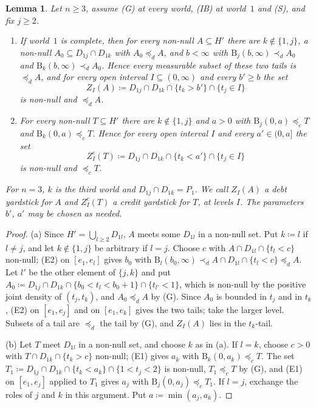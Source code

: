 \documentclass[11pt]{article}
\newtheorem{lemma}[theorem]{Lemma}
\theoremstyle{definition}\newtheorem{definition}[theorem]{Definition}
\theoremstyle{remark}\newtheorem{remark}[theorem]{Remark}
\newcommand{\Band}{\mathrm{B}}
\begin{document}
\begin{lemma}\label{lem:yard}
Let $n\ge3$, assume (G) at every world, (IB) at world~$1$ and (S), and
fix $j\ge2$.
\begin{enumerate}[label=(\alph*)]
\item If world~$1$ is complete, then for every non-null $A\subseteq H'$ there
are $k\notin\{1,j\}$, a non-null $A_0\subseteq D_{1j}\cap D_{1k}$ with
$A_0\preceq_dA$, and $b<\infty$ with $\Band_j(b,\infty)\prec_dA_0$ and
$\Band_k(b,\infty)\prec_dA_0$. Hence every measurable subset of these two
tails is $\preceq_dA$, and for every open interval $I\subseteq(0,\infty)$
and every $b'\ge b$ the set
\[
 Z_I(A)\coloneqq D_{1j}\cap D_{1k}\cap\{t_k>b'\}\cap\{t_j\in I\}
\]
is non-null and $\preceq_dA$.
\item For every non-null $T\subseteq H'$ there are $k\notin\{1,j\}$ and
$a>0$ with $\Band_j(0,a)\preceq_cT$ and $\Band_k(0,a)\preceq_cT$. Hence for
every open interval $I$ and every $a'\in(0,a]$ the set
\[
 Z^c_I(T)\coloneqq D_{1j}\cap D_{1k}\cap\{t_k<a'\}\cap\{t_j\in I\}
\]
is non-null and $\preceq_cT$.
\end{enumerate}
For $n=3$, $k$ is the third world and $D_{1j}\cap D_{1k}=P_1$. We call
$Z_I(A)$ a \emph{debt yardstick} for $A$ and $Z^c_I(T)$ a \emph{credit
yardstick} for $T$, at levels $I$. The parameters $b'$, $a'$ may be chosen
as needed.
\end{lemma}
\begin{proof}
(a) Since $H'=\bigcup_{l\ge2}D_{1l}$, $A$ meets some $D_{1l}$ in a non-null
set. Put $k\coloneqq l$ if $l\ne j$, and let $k\notin\{1,j\}$ be arbitrary if
$l=j$. Choose $c$ with $A\cap D_{1l}\cap\{t_l<c\}$ non-null; (E2) on
$[e_1,e_l]$ gives $b_0$ with $\Band_l(b_0,\infty)\prec_d
A\cap D_{1l}\cap\{t_l<c\}\preceq_dA$. Let $l'$ be the other element of
$\{j,k\}$ and put
$A_0\coloneqq D_{1j}\cap D_{1k}\cap\{b_0<t_l<b_0+1\}\cap\{t_{l'}<1\}$, which
is non-null by the positive joint density of $(t_j,t_k)$, and
$A_0\preceq_dA$ by (G). Since $A_0$ is bounded in $t_j$ and in $t_k$, (E2)
on $[e_1,e_j]$ and on $[e_1,e_k]$ gives the two tails; take the larger
level. Subsets of a tail are $\preceq_d$ the tail by (G), and $Z_I(A)$ lies
in the $t_k$-tail.

(b) Let $T$ meet $D_{1l}$ in a non-null set, and choose $k$ as in (a). If
$l=k$, choose $c>0$ with $T\cap D_{1k}\cap\{t_k>c\}$ non-null; (E1) gives
$a_k$ with $\Band_k(0,a_k)\preceq_cT$. The set
$T_1\coloneqq D_{1j}\cap D_{1k}\cap\{t_k<a_k\}\cap\{1<t_j<2\}$ is non-null,
$T_1\preceq_cT$ by (G), and (E1) on $[e_1,e_j]$ applied to $T_1$ gives $a_j$
with $\Band_j(0,a_j)\preceq_cT_1$. If $l=j$, exchange the roles of $j$ and
$k$ in this argument. Put $a\coloneqq\min(a_j,a_k)$.
\end{proof}
\end{document}
